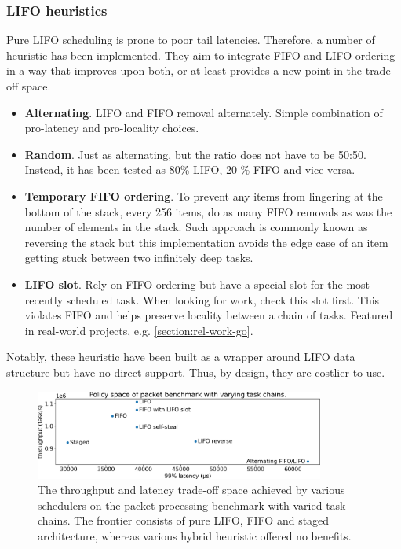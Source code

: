 \documentclass[12pt,a4paper,twoside]{report}
\begin{document}
\subsubsection{LIFO heuristics}
\label{section:lifo-heuristics}

Pure LIFO scheduling is prone to poor tail latencies. Therefore, a number of heuristic has been implemented. They aim to integrate FIFO and LIFO ordering in a way that improves upon both, or at least provides a new point in the trade-off space.
\begin{itemize}
    \item \textbf{Alternating}. LIFO and FIFO removal alternately. Simple combination of pro-latency and pro-locality choices. 
    \item \textbf{Random}. Just as alternating, but the ratio does not have to be 50:50. Instead, it has been tested as 80\% LIFO, 20 \% FIFO and vice versa.  
    \item \textbf{Temporary FIFO ordering}. To prevent any items from lingering at the bottom of the stack, every 256 items, do as many FIFO removals as was the number of elements in the stack. Such approach is commonly known as reversing the stack but this implementation avoids the edge case of an item getting stuck between two infinitely deep tasks.
    \item \textbf{LIFO slot}. Rely on FIFO ordering but have a special slot for the most recently scheduled task. When looking for work, check this slot first. This violates FIFO and helps preserve locality between a chain of tasks. Featured in real-world projects, e.g. \ref{section:rel-work-go}. 
\end{itemize}
Notably, these heuristic have been built as a wrapper around LIFO data structure but have no direct support. Thus, by design, they are costlier to use. 

\begin{figure} 
    \centering 
    \includegraphics[width=0.85\textwidth]{eval/packet-basic-base-hybrids.png}
    \caption{The throughput and latency trade-off space achieved by various schedulers on the packet processing benchmark with varied task chains. The frontier consists of pure LIFO, FIFO and staged architecture, whereas various hybrid heuristic offered no benefits.}
   \label{fig:packet-hybrids}
\end{figure}
\end{document}
